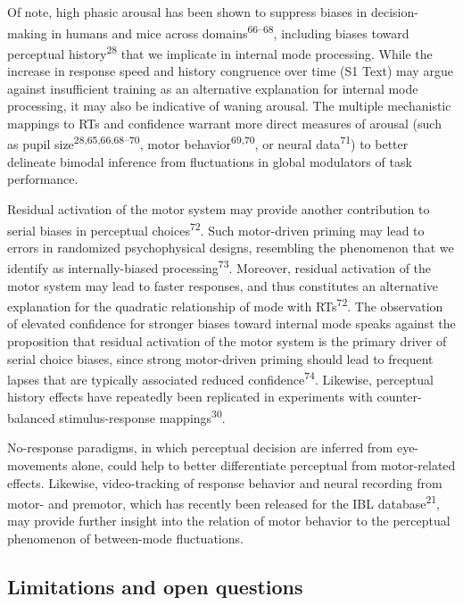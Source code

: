 \documentclass[
]{article}
\begin{document}
Of note, high phasic arousal has been shown to suppress biases in
decision-making in humans and mice across
domains\textsuperscript{66--68}, including biases toward perceptual
history\textsuperscript{28} that we implicate in internal mode
processing. While the increase in response speed and history congruence
over time (S1 Text) may argue against insufficient
training as an alternative explanation for internal mode processing, it
may also be indicative of waning arousal. The multiple mechanistic
mappings to RTs and confidence warrant more direct measures of arousal
(such as pupil size\textsuperscript{28,65,66,68--70}, motor
behavior\textsuperscript{69,70}, or neural data\textsuperscript{71}) to
better delineate bimodal inference from fluctuations in global
modulators of task performance.

Residual activation of the motor system may provide another contribution
to serial biases in perceptual choices\textsuperscript{72}. Such
motor-driven priming may lead to errors in randomized psychophysical
designs, resembling the phenomenon that we identify as internally-biased
processing\textsuperscript{73}. Moreover, residual activation of the
motor system may lead to faster responses, and thus constitutes an
alternative explanation for the quadratic relationship of mode with
RTs\textsuperscript{72}. The observation of elevated confidence for
stronger biases toward internal mode speaks against the proposition that
residual activation of the motor system is the primary driver of serial
choice biases, since strong motor-driven priming should lead to frequent
lapses that are typically associated reduced
confidence\textsuperscript{74}. Likewise, perceptual history effects
have repeatedly been replicated in experiments with counter-balanced
stimulus-response mappings\textsuperscript{30}.

No-response paradigms, in which perceptual decision are inferred from
eye-movements alone, could help to better differentiate perceptual from
motor-related effects. Likewise, video-tracking of response behavior and
neural recording from motor- and premotor, which has recently been
released for the IBL database\textsuperscript{21}, may provide further insight
into the relation of motor behavior to the perceptual phenomenon of
between-mode fluctuations.

\hypertarget{limitations-and-open-questions}{%
\subsection{Limitations and open
questions}\label{limitations-and-open-questions}}
\end{document}
